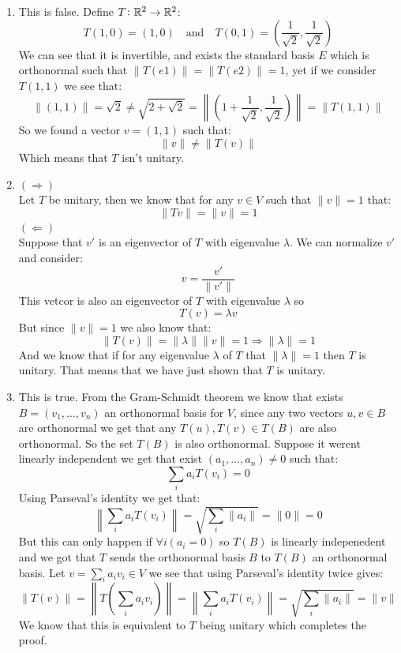 \documentclass[11pt, a4paper]{article}
\begin{document}
\begin{solution} \phantom{}
\begin{enumerate}
  \item[(1)]
This is false. Define $T\colon \mathbb{R}^2 \to \mathbb{R}^2$:
\[
  T(1,0) = (1,0) \quad\text{and}\quad 
  T(0,1) = \left(\frac{1}{\sqrt{2}},\frac{1}{\sqrt{2}}\right)
\]
We can see that it is invertible, and exists the standard basis $E$ 
which is orthonormal such that $\|T(e1)\| = \|T(e2)\| = 1$, yet if we 
consider $T(1,1)$ we see that:
\[
  \|(1,1)\| = \sqrt{2} \neq 
  \sqrt{2 + \sqrt{2}} = 
  \left\|\left(1+\frac{1}{\sqrt{2}},\frac{1}{\sqrt{2}}\right)\right\| = 
  \|T(1,1)\|
\]
So we found a vector $v = (1,1)$ such that:
\[
  \|v\| \neq \|T(v)\|
\]
Which means that $T$ isn't unitary.

\item[(2)]
$(\Rightarrow)$ \\
Let $T$ be unitary, then we know that for any $v\in V$ such that $\|v\| = 1$
that:
\[
  \|Tv\| = \|v\| = 1
\]
$(\Leftarrow)$ \\
Suppose that $v'$ is an eigenvector of $T$ with eigenvalue $\lambda$.
We can normalize $v'$ and consider:
\[
  v = \frac{v'}{\|v'\|}
\]
This vetcor is also an eigenvector of $T$ with eigenvalue $\lambda$ so
\[
  T(v) = \lambda v
\]
But since $\|v\| = 1$ we also know that:
\[
  \|T(v)\| = \|\lambda\| \|v\| = 1 \Rightarrow \|\lambda\| = 1
\]
And we know that if for any eigenvalue $\lambda$ of $T$ that 
$\|\lambda\|=1$  then $T$ is unitary. That means that we have just shown
that $T$ is unitary.

\item[(3)]
This is true. From the Gram-Schmidt theorem we know that exists 
$B=(v_1,\dots,v_n)$ an orthonormal basis for $V$, since any two vectors 
$u,v\in B$ are orthonormal we get that any $T(u),T(v)\in T(B)$ are also 
orthonormal. So the set $T(B)$ is also orthonormal. Suppose it werent 
linearly independent we get that exist $(a_1,\dots,a_n)\neq 0$ such that:
\[
  \sum_{i}{a_i T(v_i)} = 0
\]
Using Parseval's identity we get that:
\[
  \left\|\sum_{i}{a_i T(v_i)}\right\| = 
  \sqrt{\sum_{i}{\|a_i\|}} = \|0\| = 0
\]
But this can only happen if $\forall i(a_i = 0)$ so $T(B)$ is linearly
indepenedent and we got that $T$ sends the orthonormal basis $B$ to 
$T(B)$ an orthonormal basis. Let $v=\sum_{i}{a_i v_i}\in V$ we see that 
using Parseval's identity twice gives:
\[
  \|T(v)\| = \left\|T\left(\sum_{i}{a_i v_i}\right)\right\| 
  = \left\|\sum_{i}{a_i T(v_i)}\right\| = 
  \sqrt{\sum_{i}{\|a_i\|}} = \|v\|
\]
We know that this is equivalent to $T$ being unitary which completes the
proof.
\end{enumerate}
\end{solution}
\end{document}

